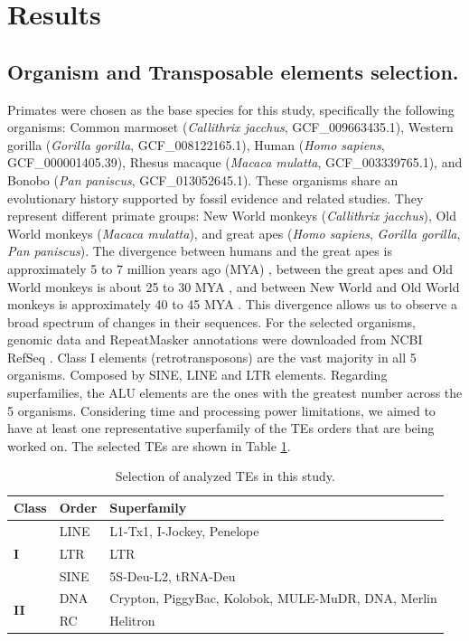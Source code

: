 \documentclass[unnumsec,webpdf,contemporary,large]{oup-authoring-template}%
\theoremstyle{thmstyleone}%
\theoremstyle{thmstyletwo}%
\theoremstyle{thmstylethree}%
\begin{document}
\section{Results}\label{sec3}

\subsection{Organism and Transposable elements selection.}\label{subsec3_1}

Primates were chosen as the base species for this study, specifically the following organisms: Common marmoset (\textit{Callithrix jacchus}, GCF{\_}009663435.1), Western gorilla (\textit{Gorilla gorilla}, GCF{\_}008122165.1), Human (\textit{Homo sapiens}, GCF{\_}000001405.39), Rhesus macaque (\textit{Macaca mulatta}, GCF{\_}003339765.1), and Bonobo (\textit{Pan paniscus}, GCF{\_}013052645.1). These organisms share an evolutionary history supported by fossil evidence and related studies. They represent different primate groups: New World monkeys (\textit{Callithrix jacchus}), Old World monkeys (\textit{Macaca mulatta}), and great apes (\textit{Homo sapiens}, \textit{Gorilla gorilla},\textit{ Pan paniscus}). The divergence between humans and the great apes is approximately 5 to 7 million years ago (MYA) \cite{glazko_estimation_2003}, between the great apes and Old World monkeys is about 25 to 30 MYA \cite{stevens_palaeontological_2013}, and between New World and Old World monkeys is approximately 40 to 45 MYA \cite{pozzi_primate_2014}. This divergence allows us to observe a broad spectrum of changes in their sequences. For the selected organisms, genomic data and RepeatMasker annotations were downloaded from NCBI RefSeq \cite{oleary_reference_2016}. Class I elements (retrotransposons) are the vast majority in all 5 organisms. Composed by SINE, LINE and LTR elements. Regarding superfamilies, the ALU elements are the ones with the greatest number across the 5 organisms. Considering time and processing power limitations, we aimed to have at least one representative superfamily of the TEs orders that are being worked on. The selected TEs are shown in Table \ref{table:tab2}. 

\begin{table}[!t]
\caption{Selection of analyzed TEs in this study.}
\label{table:tab2}
\begin{tabularx}{\columnwidth}{@{} l l X @{}}
\toprule
\textbf{Class} & \textbf{Order} & \textbf{Superfamily} \\
\midrule
\multirow{3}{*}{\textbf{I}} & LINE & L1-Tx1, I-Jockey, Penelope \\
 & LTR & LTR \\
 & SINE & 5S-Deu-L2, tRNA-Deu \\
\multirow{2}{*}{\textbf{II}} & DNA & Crypton, PiggyBac, Kolobok, MULE-MuDR, DNA, Merlin\\
 & RC & Helitron \\
\bottomrule
\end{tabularx}
\end{table}
\end{document}
